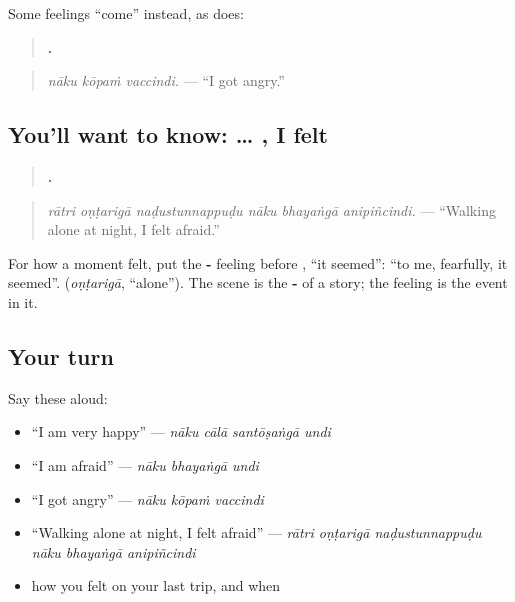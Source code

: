 Some feelings \textquotedblleft{}come\textquotedblright{} instead, as \textbf{} does:

\begin{quote}
\textbf{  .}
\end{quote}

\begin{quote}
\emph{nāku kōpaṁ vaccindi.} — \textquotedblleft{}I got angry.\textquotedblright{}
\end{quote}

\subsection*{You'll want to know: … , I felt}
\begin{quote}
\textbf{     .}
\end{quote}

\begin{quote}
\emph{rātri oṇṭarigā naḍustunnappuḍu nāku bhayaṅgā anipiñcindi.} — \textquotedblleft{}Walking alone at night, I felt afraid.\textquotedblright{}
\end{quote}

For how a moment felt, put the \textbf{-} feeling before \textbf{}, \textquotedblleft{}it seemed\textquotedblright{}: \textquotedblleft{}to me, fearfully, it seemed\textquotedblright{}. \textbf{} (\emph{oṇṭarigā}, \textquotedblleft{}alone\textquotedblright{}). The scene is the \textbf{-} of a story; the feeling is the event in it.

\subsection*{Your turn}
Say these aloud:

\begin{itemize}
\raggedright
  \item \textquotedblleft{}I am very happy\textquotedblright{} — \emph{nāku cālā santōṣaṅgā undi}
  \item \textquotedblleft{}I am afraid\textquotedblright{} — \emph{nāku bhayaṅgā undi}
  \item \textquotedblleft{}I got angry\textquotedblright{} — \emph{nāku kōpaṁ vaccindi}
  \item \textquotedblleft{}Walking alone at night, I felt afraid\textquotedblright{} — \emph{rātri oṇṭarigā naḍustunnappuḍu nāku bhayaṅgā anipiñcindi}
  \item how you felt on your last trip, and when
\end{itemize}

